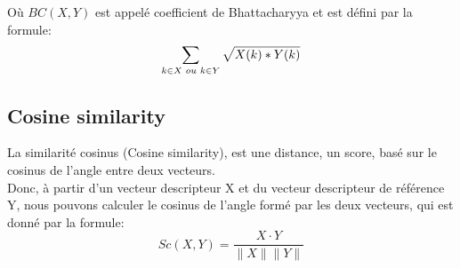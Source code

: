Où $BC(X, Y)$ est appelé coefficient de Bhattacharyya et est défini par la formule:
$$\sum_{k \in X \hspace{0.1cm} ou \hspace{0.1cm} k \in Y} \sqrt{X(k)*Y(k)}$$


\subsection{Cosine similarity}
La similarité cosinus (Cosine similarity), est une distance, un score, basé sur le cosinus de l'angle entre deux vecteurs.\\
Donc, à partir d'un vecteur descripteur X et du vecteur descripteur de référence Y, nous pouvons calculer le cosinus de l'angle formé par les deux vecteurs, qui est donné par la formule:
$$Sc(X, Y) = \frac{X \cdot Y}{\|X\|\|Y\|}$$\\



